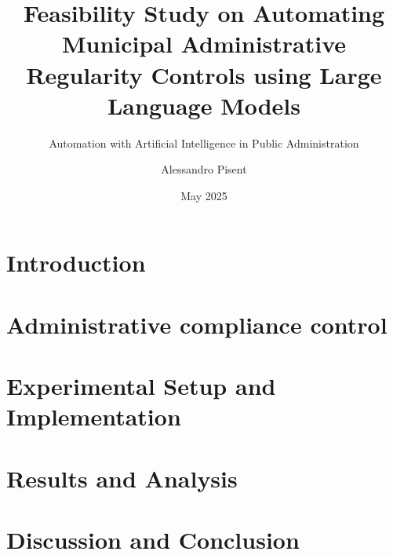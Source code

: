 \documentclass[a4paper,english,noexaminfo]{sapthesis}
\title{Feasibility Study on Automating Municipal Administrative Regularity Controls using Large Language Models}
\subtitle{Automation with Artificial Intelligence in Public Administration}
\author{Alessandro Pisent}
\date{May 2025}
\begin{document}
\maketitle
\frontmatter




\tableofcontents
\mainmatter




\chapter{Introduction}

 
\chapter{Administrative compliance control}



\chapter{Experimental Setup and Implementation}
 

\chapter{Results and Analysis}
\label{ch:Results}


\chapter{Discussion and Conclusion}






%



\end{document}
